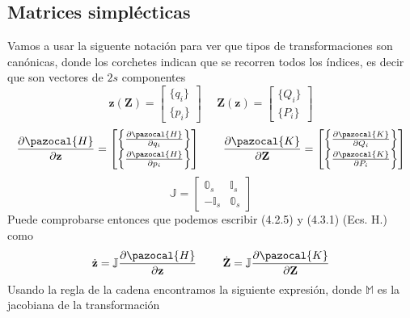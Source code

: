 \subsection{Matrices simplécticas}
Vamos a usar la siguente notación para ver que tipos de transformaciones son canónicas, donde los corchetes indican que se recorren todos los índices, es decir que son vectores de $2s$ componentes
\begin{equation} \label{4.2.7}
    \mathbf{z}(\mathbf{Z})=\left[\begin{matrix} \{q_i\}\\ \{p_i\}\end{matrix}\right] \ \ \ \ \ \ \mathbf{Z}(\mathbf{z})=\left[\begin{matrix} \{Q_i\}\\ \{P_i\}\end{matrix}\right]
\end{equation} 
\begin{equation} \label{4.2.7}
    \frac{\partial \pazocal{H}}{\partial \mathbf{z}}=\left[\begin{matrix} \left\{\frac{\partial \pazocal{H}}{\partial q_i}\right\} \\ \left\{\frac{\partial \pazocal{H}}{\partial p_i}\right\}\end{matrix}\right] \ \ \ \ \ \ \frac{\partial \pazocal{K}}{\partial \mathbf{Z}}=\left[\begin{matrix} \left\{\frac{\partial \pazocal{K}}{\partial Q_i}\right\} \\ \left\{\frac{\partial \pazocal{K}}{\partial P_i}\right\}\end{matrix}\right]
\end{equation} 
\begin{equation} \label{4.2.7}
    \mathbb{J} = \left[\begin{array}{c|c} \mathbb{0}_s & \mathbb{I}_s \\ \hline -\mathbb{I}_s & \mathbb{0}_s \end{array}\right]
\end{equation} 
Puede comprobarse entonces que podemos escribir (4.2.5) y (4.3.1) (Ecs. H.) como
\begin{equation} \label{4.2.7}
    \dot{\mathbf{z}} = \mathbb{J} \frac{\partial \pazocal{H}}{\partial \mathbf{z}} \ \ \ \ \ \ \ \dot{\mathbf{Z}} = \mathbb{J} \frac{\partial \pazocal{K}}{\partial \mathbf{Z}}
\end{equation} 
Usando la regla de la cadena encontramos la siguiente expresión, donde $\mathbb{M}$ es la jacobiana de la transformación
